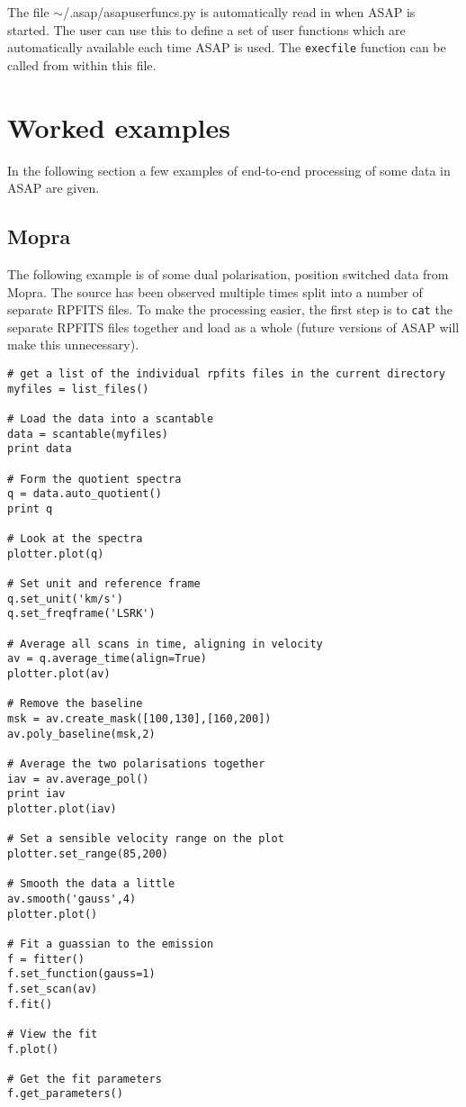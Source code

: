 \documentclass[11pt]{article}
\newcommand{\cmd}[1]{{\tt #1}}
\begin{document}
The file $\sim$/.asap/asapuserfuncs.py is automatically read in when
ASAP is started. The user can use this to define a set of user
functions which are automatically available each time ASAP is
used. The \cmd{execfile} function can be called from within this file.

\section{Worked examples}

In the following section a few examples of end-to-end processing of
some data in ASAP are given.

\subsection{Mopra}

The following example is of some dual polarisation, position switched
data from Mopra. The source has been observed multiple times split
into a number of separate RPFITS files. To make the processing easier,
the first step is to \cmd{cat} the separate RPFITS files together and
load as a whole (future versions of ASAP will make this unnecessary).


\begin{verbatim}
# get a list of the individual rpfits files in the current directory
myfiles = list_files()

# Load the data into a scantable
data = scantable(myfiles)
print data

# Form the quotient spectra
q = data.auto_quotient()
print q

# Look at the spectra
plotter.plot(q)

# Set unit and reference frame
q.set_unit('km/s')
q.set_freqframe('LSRK')

# Average all scans in time, aligning in velocity
av = q.average_time(align=True)
plotter.plot(av)

# Remove the baseline
msk = av.create_mask([100,130],[160,200])
av.poly_baseline(msk,2)

# Average the two polarisations together
iav = av.average_pol()
print iav
plotter.plot(iav)

# Set a sensible velocity range on the plot
plotter.set_range(85,200)

# Smooth the data a little
av.smooth('gauss',4)
plotter.plot()

# Fit a guassian to the emission
f = fitter()
f.set_function(gauss=1)
f.set_scan(av)
f.fit()

# View the fit
f.plot()

# Get the fit parameters
f.get_parameters()

\end{verbatim}
\end{document}
